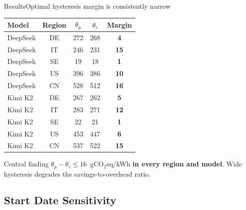 \begin{frame}[t]{Results}{Optimal hysteresis margin is consistently narrow}

  \centering
  \small
  \begin{tabular}{l|c|c|c|c}
    \toprule
    \textbf{Model} & \textbf{Region} & $\theta_p$ & $\theta_r$ & \textbf{Margin} \\
    \midrule
    DeepSeek & DE & 272 & 268 & \textbf{4} \\
    DeepSeek & IT & 246 & 231 & \textbf{15} \\
    DeepSeek & SE & 19 & 18 & \textbf{1} \\
    DeepSeek & US & 396 & 386 & \textbf{10} \\
    DeepSeek & CN & 528 & 512 & \textbf{16} \\
    \midrule
    Kimi K2 & DE & 267 & 262 & \textbf{5} \\
    Kimi K2 & IT & 283 & 271 & \textbf{12} \\
    Kimi K2 & SE & 22 & 21 & \textbf{1} \\
    Kimi K2 & US & 453 & 447 & \textbf{6} \\
    Kimi K2 & CN & 537 & 522 & \textbf{15} \\
    \bottomrule
  \end{tabular}

  \vspace{0.2cm}
  \begin{alertblock}{Central finding}
    $\theta_p - \theta_r \leq 16$~gCO$_2$eq/kWh \textbf{in every region and model}.
    Wide hysteresis degrades the savings-to-overhead ratio.
  \end{alertblock}
\end{frame}


\subsection{Start Date Sensitivity}

